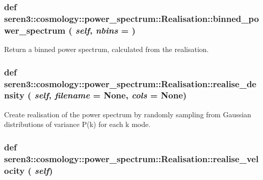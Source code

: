  \hypertarget{classseren3_1_1cosmology_1_1power__spectrum_1_1Realisation_a2ae0cbfd6b3781bf57b2b89188fc7cad}{
\subsubsection[{binned\_\-power\_\-spectrum}]{\setlength{\rightskip}{0pt plus 5cm}def seren3::cosmology::power\_\-spectrum::Realisation::binned\_\-power\_\-spectrum ( {\em self}, \/   {\em nbins} = {})}}
\label{classseren3_1_1cosmology_1_1power__spectrum_1_1Realisation_a2ae0cbfd6b3781bf57b2b89188fc7cad}
\begin{DoxyVerb}Return a binned power spectrum, calculated from the realisation.\end{DoxyVerb}
 \hypertarget{classseren3_1_1cosmology_1_1power__spectrum_1_1Realisation_a2d7f743d7a8bad924187e6f9fe379417}{
\subsubsection[{realise\_\-density}]{\setlength{\rightskip}{0pt plus 5cm}def seren3::cosmology::power\_\-spectrum::Realisation::realise\_\-density ( {\em self}, \/   {\em filename} = {\ttfamily None}, \/   {\em cols} = {\ttfamily None})}}
\label{classseren3_1_1cosmology_1_1power__spectrum_1_1Realisation_a2d7f743d7a8bad924187e6f9fe379417}
\begin{DoxyVerb}Create realisation of the power spectrum by randomly sampling
from Gaussian distributions of variance P(k) for each k mode.\end{DoxyVerb}
 \hypertarget{classseren3_1_1cosmology_1_1power__spectrum_1_1Realisation_a0e1f42e5de6f6d530735c8fe79529dd1}{
\subsubsection[{realise\_\-velocity}]{\setlength{\rightskip}{0pt plus 5cm}def seren3::cosmology::power\_\-spectrum::Realisation::realise\_\-velocity ( {\em self})}}
